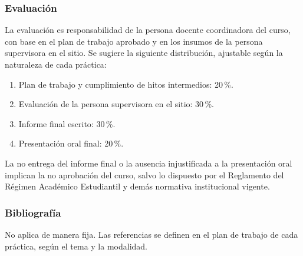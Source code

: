 \begin{refsection}
\subsubsection*{Evaluación}

La evaluación es responsabilidad de la persona docente coordinadora del curso, con base en el plan de trabajo aprobado y en los insumos de la persona supervisora en el sitio. Se sugiere la siguiente distribución, ajustable según la naturaleza de cada práctica:

\begin{enumerate}
\item Plan de trabajo y cumplimiento de hitos intermedios: 20\,\%.
\item Evaluación de la persona supervisora en el sitio: 30\,\%.
\item Informe final escrito: 30\,\%.
\item Presentación oral final: 20\,\%.
\end{enumerate}

La no entrega del informe final o la ausencia injustificada a la presentación oral implican la no aprobación del curso, salvo lo dispuesto por el Reglamento del Régimen Académico Estudiantil y demás normativa institucional vigente.

\subsubsection*{Bibliografía}

No aplica de manera fija. Las referencias se definen en el plan de trabajo de cada práctica, según el tema y la modalidad.

\end{refsection}
